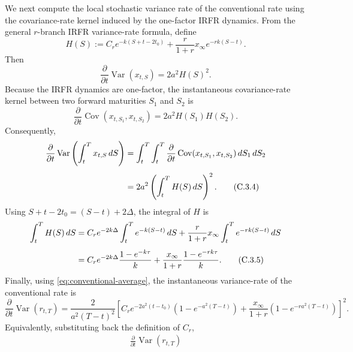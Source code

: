 \documentclass[12pt]{article}
\theoremstyle{statementstyle}
\begin{document}
\begin{appendices}
We next compute the local stochastic variance rate of the conventional
rate using the covariance-rate kernel induced by the one-factor IRFR
dynamics. From the general $r$-branch IRFR variance-rate formula, define
\begin{equation}
H(S)
:=
C_{r}e^{-k(S+t-2t_{0})}
+
\frac{r}{1+r}x_{\infty}e^{-rk(S-t)}.
\tag{C.3.1}\label{eq:H-S-general-r}
\end{equation}
Then
\begin{equation}
\frac{\partial}{\partial t}\operatorname{Var}(x_{t,S})
=
2a^{2}H(S)^{2}.
\tag{C.3.2}\label{eq:irfr-var-rate-general-r-C}
\end{equation}
Because the IRFR dynamics are one-factor, the instantaneous covariance-rate
kernel between two forward maturities $S_{1}$ and $S_{2}$ is
\begin{equation}
\frac{\partial}{\partial t}
\operatorname{Cov}(x_{t,S_{1}},x_{t,S_{2}})
=
2a^{2}H(S_{1})H(S_{2}).
\tag{C.3.3}\label{eq:cov-kernel-general-r-C}
\end{equation}
Consequently,
\begin{align}
\frac{\partial}{\partial t}
\operatorname{Var}\left(\int_t^T x_{t,S}\,dS\right)
&=
\int_t^T\int_t^T
\frac{\partial}{\partial t}
\operatorname{Cov}(x_{t,S_{1}},x_{t,S_{2}})
\,dS_{1}\,dS_{2}
\notag\\[0.4em]
&=
2a^{2}\left(\int_t^T H(S)\,dS\right)^{2}.
\tag{C.3.4}\label{eq:int-var-rate-general-r-C}
\end{align}
Using $S+t-2t_{0}=(S-t)+2\Delta$, the integral of $H$ is
\begin{align}
\int_t^T H(S)\,dS
&=
C_{r}e^{-2k\Delta}\int_t^T e^{-k(S-t)}\,dS
+
\frac{r}{1+r}x_{\infty}
\int_t^T e^{-rk(S-t)}\,dS
\notag\\[0.4em]
&=
C_{r}e^{-2k\Delta}\frac{1-e^{-k\tau}}{k}
+
\frac{x_{\infty}}{1+r}\frac{1-e^{-rk\tau}}{k}.
\tag{C.3.5}\label{eq:H-integral-general-r-C}
\end{align}
Finally, using \eqref{eq:conventional-average}, the instantaneous
variance-rate of the conventional rate is
\begin{equation}
\frac{\partial}{\partial t}\operatorname{Var}(r_{t,T})
=
\frac{2}{a^{2}(T-t)^{2}}
\left[
C_{r}e^{-2a^{2}(t-t_{0})}
\left(1-e^{-a^{2}(T-t)}\right)
+
\frac{x_{\infty}}{1+r}
\left(1-e^{-ra^{2}(T-t)}\right)
\right]^{2}.
\tag{C.3.6}\label{eq:conventional-var-rate-general-r}
\end{equation}
Equivalently, substituting back the definition of $C_{r}$,
\begin{align}
\frac{\partial}{\partial t}\operatorname{Var}(r_{t,T})

\end{align}
\end{appendices}
\end{document}

